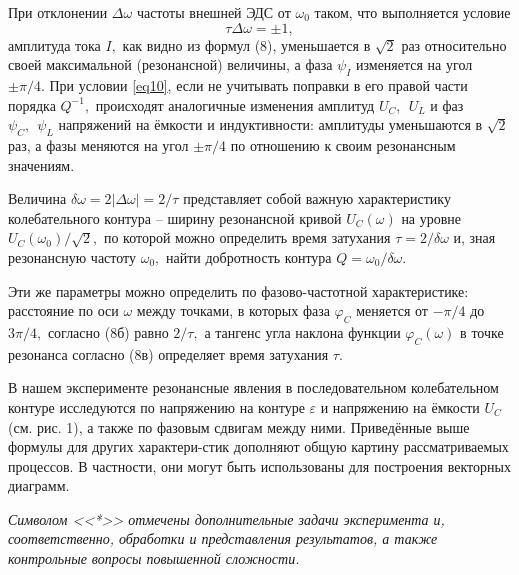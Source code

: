 При отклонении $\Delta\omega$ частоты внешней ЭДС от $\omega_0$ таком, что выполняется условие
\setcounter{equation}{9}
\begin{equation}\label{eq10}
\tau\Delta\omega=\pm1,
\end{equation}
амплитуда тока $I,$ как видно из формул (8), уменьшается в $\sqrt{2}$ раз относительно своей мак\-симальной (резонансной) величины, а фаза $\psi_I$ изменяется на угол $\pm\pi/4.$ При условии \eqref{eq10}, если не учитывать поправки в его правой части порядка $Q^{-1},$ происходят аналогичные изме\-нения амплитуд $U_C,~~U_L  $ и фаз $\psi_C,~~\psi_L$ напряжений на ёмкости и индуктивности: амплитуды уменьшаются в $\sqrt{2}$ раз, а фазы меняются на угол $\pm\pi/4$ по отношению к своим резонансным значениям.

Величина $\delta\omega=2|\Delta\omega|=2/\tau$ представляет собой важную характеристику колебательного контура – ширину резонансной кривой $U_C(\omega)$ на уровне $U_C(\omega_0)/\sqrt{2},$ по которой можно определить время затухания $\tau=2/\delta\omega$ и, зная резонансную частоту $\omega_0,$ найти добротность контура $Q=\omega_0/\delta\omega.$

Эти же параметры можно определить по фазово-частотной характеристике: расстояние по оси $\omega$ между точками, в которых фаза $\varphi_C$ меняется от $-\pi/4$ до $3\pi/4,$ согласно (8б) рав\-но $2/\tau,$ а тангенс угла наклона функции $\varphi_C(\omega)$ в точке резонанса согласно (8в) определяет время затухания $\tau.$

В нашем эксперименте резонансные явления в последовательном колебательном контуре исследуются по напряжению на контуре $\varepsilon$ и напряжению на ёмкости $U_C$ (см. рис. 1), а так\-же по фазовым сдвигам между ними. Приведённые выше формулы для других характери-стик дополняют общую картину рассматриваемых процессов. В частности, они могут быть использованы для построения векторных диаграмм.

\emph{Символом <<*>> отмечены дополнительные задачи эксперимента и, соответственно, об\-работки и представления результатов, а также контрольные вопросы повышенной слож\-ности.}

